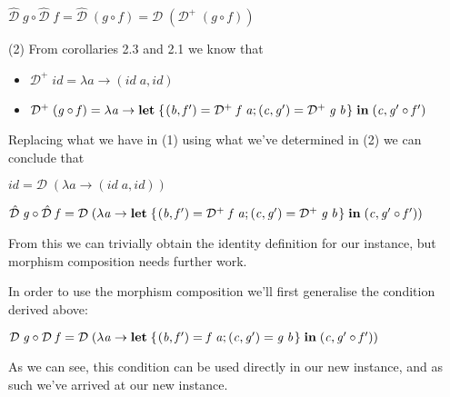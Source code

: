 \documentclass[11pt,a4]{article}
\newcommand{\Varid}[1]{\mathit{#1}}
\theoremstyle{definition}
\theoremstyle{Definition}
\theoremstyle{Definition}
\begin{document}
    \ensuremath{\mathcal{\hat{D}}\;\Varid{g}\mathbin{\circ}\mathcal{\hat{D}}\;\Varid{f}\mathrel{=}\mathcal{\hat{D}}\;(\Varid{g}\mathbin{\circ}\Varid{f})\mathrel{=}\mathcal{D}\;(\mathcal{D}^{+}\;(\Varid{g}\mathbin{\circ}\Varid{f}))}
    
(2) From corollaries 2.3 and 2.1 we know that

\begin{itemize}
    \item \ensuremath{\mathcal{D}^{+}\;\Varid{id}\mathrel{=}\lambda \Varid{a}\rightarrow (\Varid{id}\;\Varid{a},\Varid{id})}
    \item  \ensuremath{\mathcal{D}^{+}\;(\Varid{g}\mathbin{\circ}\Varid{f})\mathrel{=}\lambda \Varid{a}\rightarrow \mathbf{let}\;\{\mskip1.5mu (\Varid{b},\Varid{f'})\mathrel{=}\mathcal{D}^{+}\;\Varid{f}\;\Varid{a};(\Varid{c},\Varid{g'})\mathrel{=}\mathcal{D}^{+}\;\Varid{g}\;\Varid{b}\mskip1.5mu\}\;\mathbf{in}\;(\Varid{c},\Varid{g'}\mathbin{\circ}\Varid{f'})}
\end{itemize}

Replacing what we have in (1) using what we've determined in (2) we can conclude that

\ensuremath{\Varid{id}\mathrel{=}\mathcal{D}\;(\lambda \Varid{a}\rightarrow (\Varid{id}\;\Varid{a},\Varid{id}))}

\ensuremath{\mathcal{\hat{D}}\;\Varid{g}\mathbin{\circ}\mathcal{\hat{D}}\;\Varid{f}\mathrel{=}\mathcal{D}\;(\lambda \Varid{a}\rightarrow \mathbf{let}\;\{\mskip1.5mu (\Varid{b},\Varid{f'})\mathrel{=}\mathcal{D}^{+}\;\Varid{f}\;\Varid{a};(\Varid{c},\Varid{g'})\mathrel{=}\mathcal{D}^{+}\;\Varid{g}\;\Varid{b}\mskip1.5mu\}\;\mathbf{in}\;(\Varid{c},\Varid{g'}\mathbin{\circ}\Varid{f'}))}

From this we can trivially obtain the identity definition for our instance, but morphism composition needs further work.

In order to use the morphism composition we'll first generalise the condition derived above:

\ensuremath{\mathcal{D}\;\Varid{g}\mathbin{\circ}\mathcal{D}\;\Varid{f}\mathrel{=}\mathcal{D}\;(\lambda \Varid{a}\rightarrow \mathbf{let}\;\{\mskip1.5mu (\Varid{b},\Varid{f'})\mathrel{=}\Varid{f}\;\Varid{a};(\Varid{c},\Varid{g'})\mathrel{=}\Varid{g}\;\Varid{b}\mskip1.5mu\}\;\mathbf{in}\;(\Varid{c},\Varid{g'}\mathbin{\circ}\Varid{f'}))}

As we can see, this condition can be used directly in our new instance, and as such we've arrived at our new instance.
\end{document}
